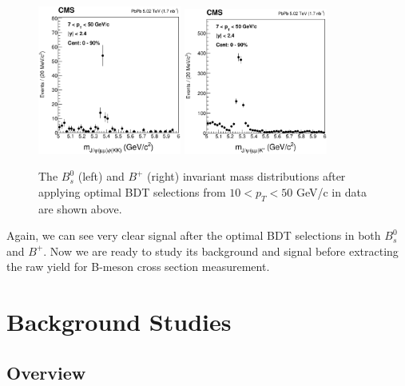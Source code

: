 \begin{figure}[h]
\begin{center}
\includegraphics[width=0.42\textwidth]{Figures/Chapter4/BsMassBDTCut.eps}
\includegraphics[width=0.42\textwidth]{Figures/Chapter4/BPMassBDTCut.eps}
\caption{The $B^0_s$ (left) and $B^+$ (right) invariant mass distributions after applying optimal BDT selections from $10 < p_T < 50$ GeV/c in data are shown above.}
\label{Bpeaks}
\end{center}
\end{figure}

Again, we can see very clear signal after the optimal BDT selections in both $B^0_s$ and $B^+$. Now we are ready to study its background and signal before extracting the raw yield for B-meson cross section measurement.

\section{Background Studies} 

\subsection{Overview}

